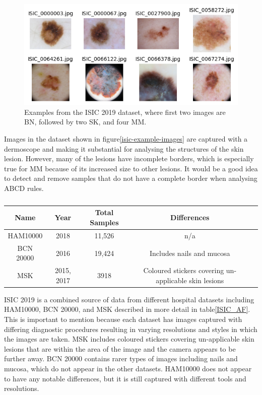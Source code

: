 \begin{figure}
	\centering
	\includegraphics[scale=0.75]{images/ISIC/isic-example-images.png}
	\caption{Examples from the ISIC 2019 dataset, where first two images are BN, followed by two SK, and four MM.}
\end{figure}\label{isic-example-images}

Images in the dataset shown in figure\ref{isic-example-images} are captured with a dermoscope and making it substantial for analysing the structures of the skin lesion. However, many of the lesions have incomplete borders, which is especially true for MM because of its increased size to other lesions. It would be a good idea to detect and remove samples that do not have a complete border when analysing ABCD rules.

\begin{table}
	\small
	\begin{tabular}{|c|c|c|c|c|}
		\hline
		Name      & Year       & Total Samples & Differences                                           \\
		\hline
		HAM10000  & 2018       & 11,526        & n/a
		\\
		\hline
		BCN 20000 & 2016       & 19,424        & Includes nails and mucosa
		\\
		\hline
		MSK       & 2015, 2017 & 3918          & Coloured stickers covering un-applicable skin lesions
		\\
		\hline
	\end{tabular}
	\caption{}
\end{table}\label{ISIC_AF}


ISIC 2019 is a combined source of data from different hospital datasets including HAM10000, BCN 20000, and MSK described in more detail in table\ref{ISIC_AF}. This is important to mention because each dataset has images captured with differing diagnostic procedures resulting in varying resolutions and styles in which the images are taken. MSK includes coloured stickers covering un-applicable skin lesions that are within the area of the image and the camera appears to be further away. BCN 20000 contains rarer types of images including nails and mucosa, which do not appear in the other datasets. HAM10000 does not appear to have any notable differences, but it is still captured with different tools and resolutions.

